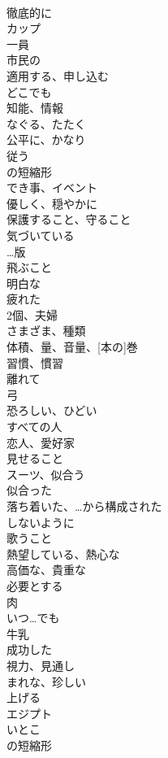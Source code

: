 \documentclass[8pt]{extreport}
\begin{document}
\begin{CJK}{UTF8}{min}
\\	徹底的に	
\\	カップ	
\\	一員	
\\	市民の	
\\	適用する、申し込む	
\\	どこでも	
\\	知能、情報	
\\	なぐる、たたく	
\\	公平に、かなり	
\\	従う	
\\	の短縮形	
\\	でき事、イベント	
\\	優しく、穏やかに	
\\	保護すること、守ること	
\\	気づいている	
\\	…版	
\\	飛ぶこと	
\\	明白な	
\\	疲れた	
\\	2個、夫婦	
\\	さまざま、種類	
\\	体積、量、音量、[本の]巻	
\\	習慣、慣習	
\\	離れて	
\\	弓	
\\	恐ろしい、ひどい	
\\	すべての人	
\\	恋人、愛好家	
\\	見せること	
\\	スーツ、似合う	
\\	似合った	
\\	落ち着いた、…から構成された	
\\	しないように	
\\	歌うこと	
\\	熱望している、熱心な	
\\	高価な、貴重な	
\\	必要とする	
\\	肉	
\\	いつ…でも	
\\	牛乳	
\\	成功した	
\\	視力、見通し	
\\	まれな、珍しい	
\\	上げる	
\\	エジプト	
\\	いとこ	
\\	の短縮形	

\end{CJK}
\end{document}
